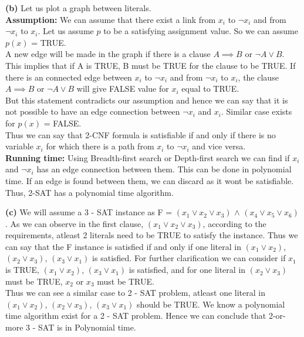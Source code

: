 \documentclass[11pt]{article}
\renewcommand\part[1]{\vspace{.10in}\textbf{(#1)}}
\newcommand\assumption{\vspace{.10in}\textbf{Assumption: }}
\newcommand\runtime{\vspace{.10in}\textbf{Running time: }}
\begin{document}
\part{b}
Let us plot a graph between literals.\\
\assumption We can assume that there exist a link from $x_i$ to $\neg x_i$ and from $\neg x_i$ to $x_i$. Let us assume $p$ to be a satisfying assignment value. So we can assume $p(x)$ = TRUE.\\
A new edge will be made in the graph if there is a clause $A \implies B$ or $\neg A \lor B$. This implies that if A is TRUE, B must be TRUE for the clause to be TRUE. If there is an connected edge between $x_i$ to $\neg x_i$ and from $\neg x_i$ to $x_i$, the clause $A \implies B$ or $\neg A \lor B$ will give FALSE value for $x_i$ equal to TRUE.\\
But this statement contradicts our assumption and hence we can say that it is not possible to have an edge connection between $\neg x_i$ and $x_i$. Similar case exists for $p(x)$ = FALSE.\\
Thus we can say that 2-CNF formula is satisfiable if and only if there is no variable $x_i$ for which there is a
path from $x_i$ to $\neg x_i$ and vice versa.\\
\runtime Using Breadth-first search or Depth-first search we can find if $x_i$ and $\neg x_i$ has an edge connection between them. This can be done in polynomial time. If an edge is found between them, we can discard as it wont be satisfiable.\\
Thus, 2-SAT has a polynomial time algorithm.

\part{c}
We will assume a 3 - SAT instance as F = $(x_{1} \lor x_{2} \lor x_{3})$ $\land$ $(x_{4} \lor x_{5} \lor x_{6})$. As we can observe in the first clause, $(x_{1} \lor x_{2} \lor x_{3})$, according to the requirements, atleast 2 literals need to be TRUE to satisfy the instance. Thus we can say that the F instance is satisfied if and only if one literal in $(x_{1} \lor x_{2})$, $(x_{2} \lor x_{3})$, $(x_{3} \lor x_{1})$ is satisfied. For further clarification we can consider if $x_1$ is TRUE, $(x_{1} \lor x_{2})$, $(x_{3} \lor x_{1})$ 
is satisfied, and for one literal in $(x_{2} \lor x_{3})$ must be TRUE, $x_2$ or $x_3$ must be TRUE.\\
Thus we can see a similar case to 2 - SAT problem, atleast one literal in $(x_{1} \lor x_{2})$, $(x_{2} \lor x_{3})$, $(x_{3} \lor x_{1})$ should be TRUE. We know a polynomial time algorithm exist for a 2 - SAT problem. Hence we can conclude that 2-or-more 3 - SAT is in Polynomial time.
 
\end{document}
